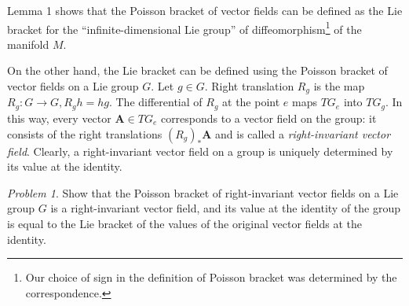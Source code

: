 \documentclass[leqno]{report}
\numberwithin{equation}{section}
\theoremstyle{plain}
\theoremstyle{definition}
\theoremstyle{remark}
\theoremstyle{smallcap}
\newtheorem*{prob*}{Problem}
\numberwithin{prob}{section}
\begin{document}
Lemma 1 shows that the Poisson bracket of vector fields
can be defined as the Lie bracket for the
``infinite-dimensional Lie group''
of diffeomorphism\footnote{
  Our choice of sign in the definition of Poisson bracket
  was determined by the correspondence.
}
of the manifold $M$.

On the other hand,
the Lie bracket can be defined
using the Poisson bracket of vector fields
on a Lie group $G$.
%
Let $g \in G$.
%
Right translation $R_g$ is the map
$R_g: G \to G, R_g h = h g$.
%
The differential of $R_g$ at the point $e$
maps $TG_e$ into $TG_g$.
%
%
In this way, every vector $\mathbf A \in TG_e$
corresponds to a vector field on the group:
it consists of the right translations $(R_g)_* \mathbf A$
and is called a \emph{right-invariant vector field}.
%
Clearly, a right-invariant vector field
on a group is uniquely determined by its value
at the identity.

\begin{prob*}
  Show that the Poisson bracket of right-invariant vector fields
  on a Lie group $G$ is a right-invariant vector field,
  and its value at the identity of the group is equal to
  the Lie bracket of the values of the original vector fields
  at the identity.
\end{prob*}
\end{document}
